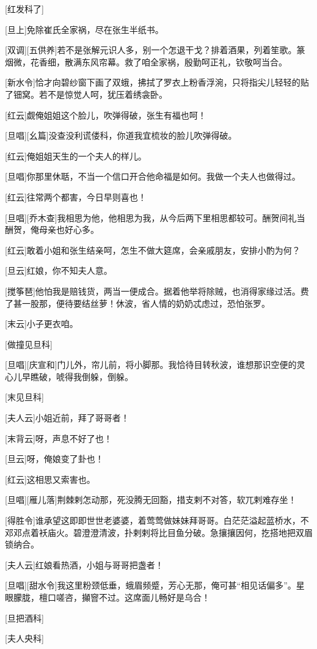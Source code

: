 \documentclass{book}
\begin{document}
[红发科了]

[旦上]免除崔氏全家祸，尽在张生半纸书。

[双调][五供养]若不是张解元识人多，别一个怎退干戈？排着酒果，列着笙歌。篆烟微，花香细，散满东风帘幕。救了咱全家祸，殷勤呵正礼，钦敬呵当合。

[新水令]恰才向碧纱窗下画了双蛾，拂拭了罗衣上粉香浮涴，只将指尖儿轻轻的贴了钿窝。若不是惊觉人呵，犹压着绣衾卧。

[红云]觑俺姐姐这个脸儿，吹弹得破，张生有福也呵！

[旦唱][幺篇]没查没利谎偻科，你道我宜梳妆的脸儿吹弹得破。

[红云]俺姐姐天生的一个夫人的样儿。

[旦唱]你那里休聒，不当一个信口开合他命福是如何。我做一个夫人也做得过。

[红云]往常两个都害，今日早则喜也！

[旦唱][乔木查]我相思为他，他相思为我，从今后两下里相思都较可。酬贺间礼当酬贺，俺母亲也好心多。

[红云]敢着小姐和张生结亲呵，怎生不做大筵席，会亲戚朋友，安排小酌为何？

[旦云]红娘，你不知夫人意。

[搅筝琶]他怕我是赔钱货，两当一便成合。据着他举将除贼，也消得家缘过活。费了甚一股那，便待要结丝萝！休波，省人情的奶奶忒虑过，恐怕张罗。

[末云]小子更衣咱。

[做撞见旦科]

[旦唱][庆宣和]门儿外，帘儿前，将小脚那。我恰待目转秋波，谁想那识空便的灵心儿早瞧破，唬得我倒躲，倒躲。

[末见旦科]

[夫人云]小姐近前，拜了哥哥者！

[末背云]呀，声息不好了也！

[旦云]呀，俺娘变了卦也！

[红云]这相思又索害也。

[旦唱][雁儿落]荆棘剌怎动那，死没腾无回豁，措支剌不对答，软兀剌难存坐！

[得胜令]谁承望这即即世世老婆婆，着莺莺做妹妹拜哥哥。白茫茫溢起蓝桥水，不邓邓点着袄庙火。碧澄澄清波，扑剌剌将比目鱼分破。急攘攘因何，扢搭地把双眉锁纳合。

[夫人云]红娘看热酒，小姐与哥哥把盏者！

[旦唱][甜水令]我这里粉颈低垂，蛾眉频蹙，芳心无那，俺可甚``相见话偏多''。星眼朦胧，檀口嗟咨，攧窨不过。这席面儿畅好是乌合！

[旦把酒科]

[夫人央科]
\end{document}
